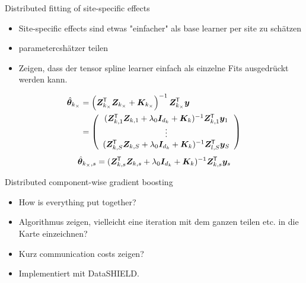\documentclass[t,10pt]{beamer}
\newcommand{\penMat}{\bm{K}}
\newcommand{\idMat}{\bm{I}}
\begin{document}
\begin{frame}{Distributed fitting of site-specific effects}
  \begin{itemize}
    \item Site-specific effects sind etwas "einfacher" als base learner per site zu schätzen
    \item parametercshätzer teilen
    \item Zeigen, dass der tensor spline learner einfach als einzelne Fits ausgedrückt werden kann.
  \end{itemize}
  \begin{align*}
    \tbh_{\lsite}%
    &= \left(\design_{\lsite}^\tran \design_{\lsite} +  \penMat_{\lsite}\right)^{-1}\design_{\lsite}^\tran \yv
    \notag \\
    &= \left(
    \begin{array}{c}
         (\design_{\blk,1}^\tran \design_{\blk,1} + \lambda_0\idMat_{d_\blk} + \penMat_\blk)^{-1} \design_{\blk,1}^\tran \yv_1 \\
         \vdots \\
         (\design_{\blk,\nSites}^\tran \design_{\blk,\nSites} + \lambda_0\idMat_{d_\blk} + \penMat_\blk)^{-1} \design_{l,\nSites}^\tran \yv_\nSites
    \end{array}
    \right)%
  \end{align*}
  \[\tbh_{{\lsite},\iSite} = (\design_{\blk,\iSite}^\tran \design_{\blk,\iSite} + \lambda_0\idMat_{d_\blk} + \penMat_\blk)^{-1} \design_{\blk,\iSite}^\tran \yv_\iSite\]

\end{frame}

\begin{frame}{Distributed component-wise gradient boosting}
  \begin{itemize}
    \item How is everything put together?
    \item Algorithmus zeigen, vielleicht eine iteration mit dem ganzen teilen etc. in die Karte einzeichnen?
    \item Kurz communication costs zeigen?
    \item Implementiert mit DataSHIELD.
  \end{itemize}
\end{frame}
\end{document}
